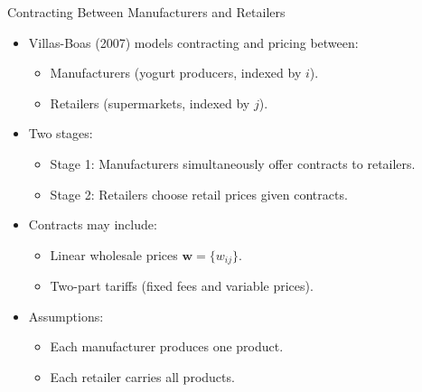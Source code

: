 \documentclass[aspectratio=169]{beamer}  %
\begin{document}
\begin{frame}{Contracting Between Manufacturers and Retailers}
    \begin{itemize}
        \item Villas-Boas (2007) models contracting and pricing between:
        \begin{itemize}
            \item Manufacturers (yogurt producers, indexed by \(i\)).
            \item Retailers (supermarkets, indexed by \(j\)).
        \end{itemize}
        \item Two stages:
        \begin{itemize}
            \item Stage 1: Manufacturers simultaneously offer contracts to retailers.
            \item Stage 2: Retailers choose retail prices given contracts.
        \end{itemize}
        \item Contracts may include:
        \begin{itemize}
            \item Linear wholesale prices \(\boldsymbol{w} = \{w_{ij}\}\).
            \item Two-part tariffs (fixed fees and variable prices).
        \end{itemize}
        \item Assumptions:
        \begin{itemize}
            \item Each manufacturer produces one product.
            \item Each retailer carries all products.
        \end{itemize}
    \end{itemize}
\end{frame}
\end{document}
